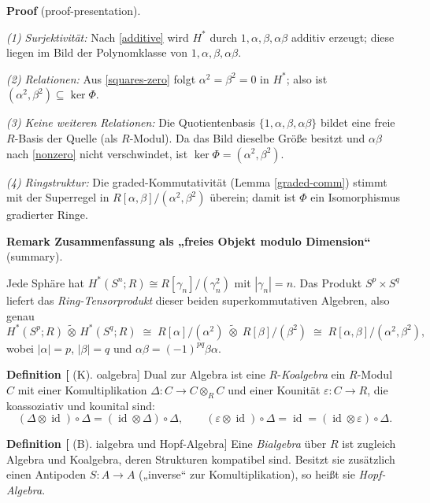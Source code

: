 \documentclass[10pt, letterpaper]{article}
\newcommand{\id}{\operatorname{id}}
\newcommand{\CustomHeading}[3]{%
  \par\medskip\noindent%
  \textbf{#1 #2} \textnormal{(#3)}.\enskip%
}
\newenvironment{DEF}[2]{\begin{unitbox}\CustomHeading{Definition}{#1}{#2}}{\end{unitbox}}
\newenvironment{REM}[2]{\begin{unitbox}\CustomHeading{Remark}{#1}{#2}}{\end{unitbox}}
\newenvironment{PROOF}[2]{\begin{unitbox}\CustomHeading{Proof}{#1}{#2}}{\end{unitbox}}
\begin{document}
\begin{PROOF}{}{proof-presentation}
\emph{(1) Surjektivität:} Nach \ref{additive} wird \(H^\ast\) durch \(1,\alpha,\beta,\alpha\beta\) additiv erzeugt; 
diese liegen im Bild der Polynomklasse von \(1,\alpha,\beta,\alpha\beta\).

\emph{(2) Relationen:} Aus \ref{squares-zero} folgt \(\alpha^2=\beta^2=0\) in \(H^\ast\); 
also ist \((\alpha^2,\beta^2)\subseteq\ker\Phi\).

\emph{(3) Keine weiteren Relationen:} Die Quotientenbasis \(\{1,\alpha,\beta,\alpha\beta\}\) 
bildet eine freie \(R\)-Basis der Quelle (als \(R\)-Modul). 
Da das Bild dieselbe Größe besitzt und \(\alpha\beta\) nach \ref{nonzero} nicht verschwindet, 
ist \(\ker\Phi= (\alpha^2,\beta^2)\).

\emph{(4) Ringstruktur:} Die graded-Kommutativität (Lemma \ref{graded-comm}) stimmt mit der Superregel 
in \(R[\alpha,\beta]/(\alpha^2,\beta^2)\) überein; damit ist \(\Phi\) ein Isomorphismus gradierter Ringe.
\end{PROOF}

\begin{REM}{Zusammenfassung als „freies Objekt modulo Dimension“}{summary}
Jede Sphäre hat \(H^\ast(S^n;R)\cong R[\gamma_n]/(\gamma_n^2)\) mit \(|\gamma_n|=n\).
Das Produkt \(S^p\times S^q\) liefert das \emph{Ring-Tensorprodukt} dieser beiden 
superkommutativen Algebren, also genau
\[
H^\ast(S^p;R)\,\widetilde{\otimes}\,H^\ast(S^q;R) 
\;\cong\; R[\alpha]/(\alpha^2)\;\widetilde{\otimes}\;R[\beta]/(\beta^2)
\;\cong\; R[\alpha,\beta]/(\alpha^2,\beta^2),
\]
wobei \(|\alpha|=p\), \(|\beta|=q\) und \(\alpha\beta=(-1)^{pq}\beta\alpha\).
\end{REM}


\pagebreak

\begin{DEF}[Koalgebra]
Dual zur Algebra ist eine \(R\)-\emph{Koalgebra} ein \(R\)-Modul \(C\)
mit einer Komultiplikation \(\Delta:C\to C\otimes_R C\)
und einer Kounität \(\varepsilon:C\to R\),
die koassoziativ und kounital sind:
\[
(\Delta\otimes\id)\circ\Delta=(\id\otimes\Delta)\circ\Delta,\qquad
(\varepsilon\otimes\id)\circ\Delta=\id=(\id\otimes\varepsilon)\circ\Delta.
\]
\end{DEF}

\begin{DEF}[Bialgebra und Hopf-Algebra]
Eine \emph{Bialgebra} über \(R\) ist zugleich Algebra und Koalgebra,
deren Strukturen kompatibel sind.
Besitzt sie zusätzlich einen Antipoden \(S:A\to A\)
(„inverse“ zur Komultiplikation),
so heißt sie \emph{Hopf-Algebra}.
\end{DEF}
\end{document}
